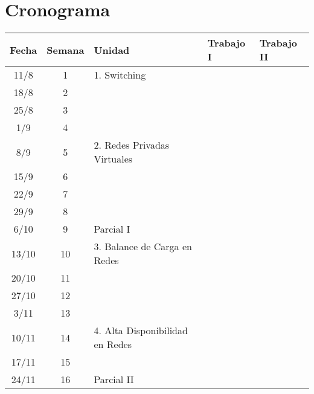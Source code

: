 
\section {Cronograma}
\begin{tabular}{c|c|l|l|l}
Fecha & Semana & Unidad & Trabajo I & Trabajo II\\
\hline
\hline
11/8 & 1	& 	1. Switching 					& 	& \\
18/8 & 2 	& 								 	& 	& \\
25/8 & 3	& 									&	& \\
1/9 & 4 	& 									&	& \\
\hline
\hline
8/9 & 5		& 	2. Redes Privadas Virtuales 	& 	& \\
15/9 & 6	& 									&	& \\
22/9 & 7 	& 									&   & \\
29/9 & 8	& 									&  	& \\ 
6/10& 9		& 	Parcial I						& 	& \\
\hline
\hline
13/10 & 10	& 	3. Balance de Carga en Redes	& 	& \\ 
20/10 & 11	& 									& 	& \\
27/10 & 12	& 									&	& \\
3/11 & 13	& 									&	& \\
\hline
\hline
10/11 & 14	& 	4. Alta Disponibilidad en Redes	&	& \\
17/11 & 15	& 									&	& \\
24/11 & 16	& 	Parcial II						&	& \\ 
\hline
\end{tabular}




